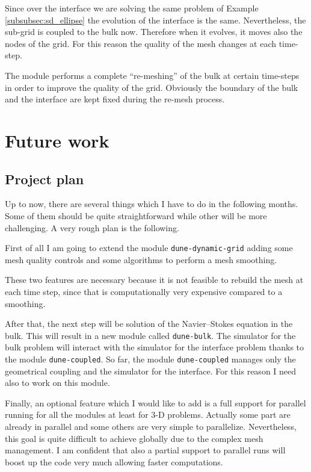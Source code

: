 \documentclass[a4paper,11pt, onecolumn]{article}
\begin{document}
\noindent Since over the interface we are solving the same problem of Example \ref{subsubsec:sd_ellipse} the evolution of the interface is the same. Nevertheless, the sub-grid is coupled to the bulk now. Therefore when it evolves, it moves also the nodes of the grid. For this reason the quality of the mesh changes at each time-step.

\noindent The module performs a complete ``re-meshing'' of the bulk at certain time-steps in order to improve the quality of the grid. Obviously the boundary of the bulk and the interface are kept fixed during the re-mesh process. 

\newpage

\section{Future work}

\subsection{Project plan}

Up to now, there are several things which I have to do in the following months. Some of them should be quite straightforward while other will be more challenging. A very rough plan is the following.
\newline

\noindent First of all I am going to extend the module \verb|dune-dynamic-grid| adding some mesh quality controls and some algorithms to perform a mesh smoothing.

\noindent These two features are necessary because it is not feasible to rebuild the mesh at each time step, since that is computationally very expensive compared to a smoothing.
\newline

\noindent After that, the next step will be solution of the Navier--Stokes equation in the bulk. This will result in a new module called \verb|dune-bulk|. The simulator for the bulk problem will interact with the simulator for the interface problem thanks to the module \verb|dune-coupled|.
\noindent So far, the module \verb|dune-coupled| manages only the geometrical coupling and the simulator for the interface. For this reason I need also to work on this module.
\newline

\noindent Finally, an optional feature which I would like to add is a full support for parallel running for all the modules at least for 3-D problems. Actually some part are already in parallel and some others are very simple to parallelize. Nevertheless, this goal is quite difficult to achieve globally due to the complex mesh management. I am confident that also a partial support to parallel runs will boost up the code very much allowing faster computations.
\end{document}
